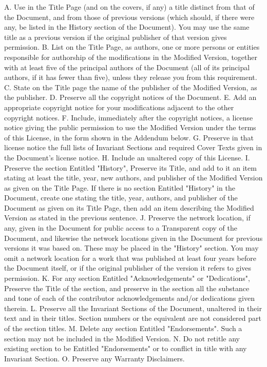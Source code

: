 \documentclass[oneside,english,a4paper,10pt,oneside,openany,final]{memoir}
\begin{document}
    A. Use in the Title Page (and on the covers, if any) a title distinct from that of the Document, and from those of previous versions (which should, if there were any, be listed in the History section of the Document). You may use the same title as a previous version if the original publisher of that version gives permission.
    B. List on the Title Page, as authors, one or more persons or entities responsible for authorship of the modifications in the Modified Version, together with at least five of the principal authors of the Document (all of its principal authors, if it has fewer than five), unless they release you from this requirement.
    C. State on the Title page the name of the publisher of the Modified Version, as the publisher.
    D. Preserve all the copyright notices of the Document.
    E. Add an appropriate copyright notice for your modifications adjacent to the other copyright notices.
    F. Include, immediately after the copyright notices, a license notice giving the public permission to use the Modified Version under the terms of this License, in the form shown in the Addendum below.
    G. Preserve in that license notice the full lists of Invariant Sections and required Cover Texts given in the Document's license notice.
    H. Include an unaltered copy of this License.
    I. Preserve the section Entitled "History", Preserve its Title, and add to it an item stating at least the title, year, new authors, and publisher of the Modified Version as given on the Title Page. If there is no section Entitled "History" in the Document, create one stating the title, year, authors, and publisher of the Document as given on its Title Page, then add an item describing the Modified Version as stated in the previous sentence.
    J. Preserve the network location, if any, given in the Document for public access to a Transparent copy of the Document, and likewise the network locations given in the Document for previous versions it was based on. These may be placed in the "History" section. You may omit a network location for a work that was published at least four years before the Document itself, or if the original publisher of the version it refers to gives permission.
    K. For any section Entitled "Acknowledgements" or "Dedications", Preserve the Title of the section, and preserve in the section all the substance and tone of each of the contributor acknowledgements and/or dedications given therein.
    L. Preserve all the Invariant Sections of the Document, unaltered in their text and in their titles. Section numbers or the equivalent are not considered part of the section titles.
    M. Delete any section Entitled "Endorsements". Such a section may not be included in the Modified Version.
    N. Do not retitle any existing section to be Entitled "Endorsements" or to conflict in title with any Invariant Section.
    O. Preserve any Warranty Disclaimers.
\end{document}
